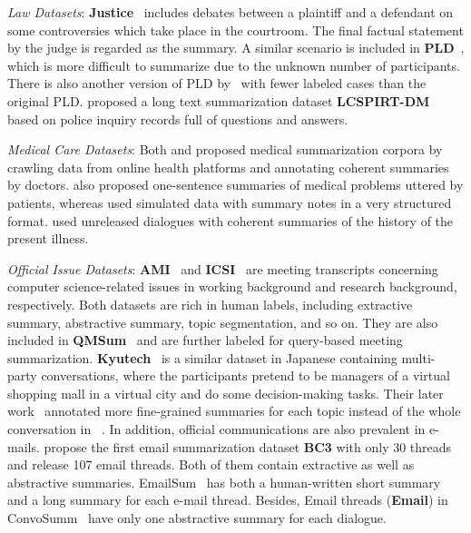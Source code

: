\textit{Law Datasets}: \textbf{Justice}~\cite{fuzw20} includes 
debates between a plaintiff and a defendant on some controversies 
which take place in the courtroom. The final factual statement by the 
judge is regarded as the summary.
A similar scenario is included in \textbf{PLD}~\cite{duan2019legal}, which is more 
difficult to summarize due to the unknown number of participants. There is also another version 
of PLD by~\citet{gan2021inspectional} with fewer labeled cases than the 
original PLD.
\citet{xi2020global} proposed a long text summarization dataset \textbf{LCSPIRT-DM} based 
on police inquiry records full of questions and answers.


\textit{Medical Care Datasets}:
Both \citet{joshi2020dr} and \citet{song2020summarizing} proposed medical summarization corpora by crawling data from online health platforms and annotating coherent summaries by doctors. \citet{song2020summarizing} also proposed one-sentence summaries of medical problems uttered by patients, whereas \citet{liu2019topic} used simulated data with summary notes in a very structured format.
 \citet{zhang2021leveraging} used unreleased dialogues with coherent summaries of the history of the present illness. %

\textit{Official Issue Datasets}: \textbf{AMI}~\cite{carletta2005ami} and \textbf{ICSI}~\cite{janin2003icsi} are meeting transcripts concerning 
computer science-related issues in working background and research background, respectively. Both datasets are rich in human labels, including extractive summary, abstractive summary, topic segmentation, and so on. They are also included in \textbf{QMSum}~\cite{zhong2021qmsum} and are further labeled for query-based meeting summarization. \textbf{Kyutech}~\cite{yamamura2016kyutech} is a similar dataset in Japanese containing multi-party conversations, where the participants pretend to be managers of a virtual shopping mall in a virtual city and do some decision-making tasks. Their later work~\cite{nakayama2021corpus} annotated more fine-grained summaries for each topic instead of the whole conversation in ~\cite{yamamura2016kyutech}.
In addition, official communications are also prevalent in e-mails. 
\citet{ulrich2008publicly} propose the first email summarization dataset \textbf{BC3} with only 30 threads and \citet{loza2014email} release 107 email threads. Both of them contain extractive as well as abstractive summaries.
EmailSum~\cite{zhang2021emailsum} has both a human-written short summary and a long summary for each e-mail thread. 
Besides, Email threads (\textbf{Email}) in ConvoSumm~\cite{fabbri2021convosumm} have only one abstractive summary for each dialogue.


